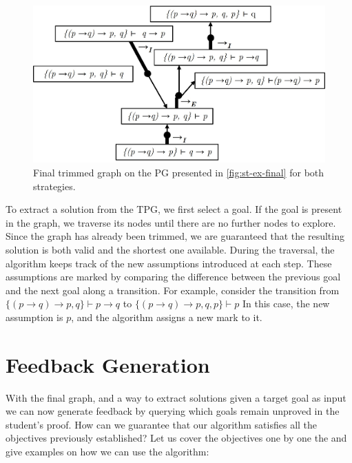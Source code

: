 \begin{figure}[H]
    \centering
    \includegraphics[width=0.7\linewidth]{Chapters/Figures/trimmed.jpg}
    \caption{Final trimmed graph on the PG presented in \autoref{fig:st-ex-final} for both strategies.}
    \label{fig:trimmed}
\end{figure}

To extract a solution from the \gls{TPG}, we first select a goal. If the goal is present in the graph, we traverse its nodes until there are no further nodes to explore. Since the graph has already been trimmed, we are guaranteed that the resulting solution is both valid and the shortest one available. During the traversal, the algorithm keeps track of the new assumptions introduced at each step. These assumptions are marked by comparing the difference between the previous goal and the next goal along a transition. For example, consider the transition from \(\{(p \to q) \to p, q\} \vdash p \to q\) to \(\{(p \to q) \to p, q, p\} \vdash p\) In this case, the new assumption is \(p\), and the algorithm assigns a new mark to it. 


  
  

\section{Feedback Generation}
With the final graph, and a way to extract solutions given a target goal as input we can now generate feedback by querying which goals remain unproved in the student's proof. How can we guarantee that our algorithm satisfies all the objectives previously established? Let us cover the objectives one by one the and give examples on how we can use the algorithm:

